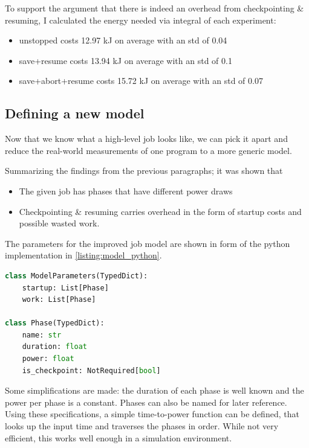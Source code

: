 To support the argument that there is indeed an overhead from checkpointing \& resuming, I calculated the energy needed via integral of each experiment:

\begin{itemize}
    \item  unstopped costs 12.97 kJ on average with an std of 0.04
    \item  save+resume costs 13.94 kJ on average with an std of 0.1
    \item  save+abort+resume costs 15.72 kJ on average with an std of 0.07
\end{itemize}

\subsection{Defining a new model}

Now that we know what a high-level job looks like, we can pick it apart and reduce the real-world measurements of one program to a more generic model. 

Summarizing the findings from the previous paragraphs; it was shown that 

\begin{itemize}
    \item The given job has phases that have different power draws
    \item Checkpointing \& resuming carries overhead in the form of startup costs and possible wasted work.
\end{itemize}

The parameters for the improved job model are shown in form of the python implementation in \ref{listing:model_python}. 

\begin{lstlisting}[language=python, frame=single, numbers=none, caption={Python Model definition}, basicstyle=\ttfamily, label={listing:model_python}]
class ModelParameters(TypedDict):
    startup: List[Phase]
    work: List[Phase]
    
class Phase(TypedDict):
    name: str
    duration: float
    power: float
    is_checkpoint: NotRequired[bool]   
\end{lstlisting}

Some simplifications are made: the duration of each phase is well known and the power per phase is a constant. Phases can also be named for later reference.
Using these specifications, a simple time-to-power function can be defined, that looks up the input time and traverses the phases in order. While not very efficient, this works well enough in a simulation environment.

